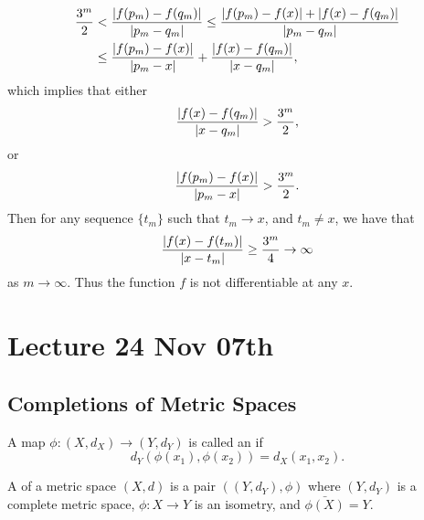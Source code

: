 \documentclass[notoc,notitlepage]{tufte-book}
\begin{document}
\begin{eg}
\begin{align*}
    \frac{3^m}{2} &< \frac{\left| f(p_m) - f(q_m) \right|}{\left| p_m - q_m \right|} \leq \frac{\left| f(p_m) - f(x) \right| + \left| f(x) - f(q_m) \right|}{\left| p_m - q_m \right|} \\
                  &\leq \frac{\left| f(p_m) - f(x) \right|}{\left| p_m - x \right|} + \frac{\left| f(x) - f(q_m) \right|}{\left| x - q_m \right|},
  \end{align*}
  which implies that either
  \begin{equation*}
    \frac{\left| f(x) - f(q_m) \right|}{\left| x - q_m \right|} > \frac{3^m}{2},
  \end{equation*}
  or
  \begin{equation*}
    \frac{\left| f(p_m) - f(x) \right|}{\left| p_m - x \right|} > \frac{3^m}{2}.
  \end{equation*}
  Then for any sequence $\{ t_m \}$ such that $t_m \to x$, and $t_m \neq x$, we have that
  \begin{equation*}
    \frac{\left| f(x) - f(t_m) \right|}{\left| x - t_m \right|} \geq \frac{3^m}{4} \to \infty
  \end{equation*}
  as $m \to \infty$. Thus the function $f$ is not differentiable at any $x$.
\end{eg}




\chapter{Lecture 24 Nov 07th}%
\label{chp:lecture_24_nov_07th}

\section{Completions of Metric Spaces}%
\label{sec:completions_of_metric_spaces}

\begin{defn}[Isometry]\label{defn:isometry}
  A map $\phi : (X, d_X) \to (Y, d_Y)$ is called an  if
  \begin{equation*}
    d_Y( \phi(x_1), \phi(x_2) ) = d_X(x_1, x_2).
  \end{equation*}
\end{defn}

\begin{defn}[Completion]\label{defn:completion}
  A  of a metric space $(X, d)$ is a pair $\left( \left(Y, d_Y\right), \phi \right)$ where $\left(Y, d_Y\right)$ is a complete metric space, $\phi : X \to Y$ is an isometry, and $\bar{\phi(X)} = Y$.
\end{defn}
\end{document}
